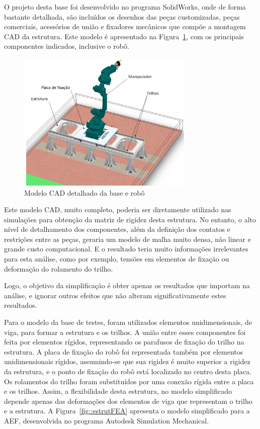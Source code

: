 O projeto desta base foi desenvolvido no programa SolidWorks, onde de forma
bastante detalhada, são incluídos os desenhos das peças customizadas, peças
comerciais, acessórios de união e fixadores mecânicos que compõe a montagem CAD
da estrutura. Este modelo é apresentado na Figura~\ref{fig::estrutCAD}, com os
principais componentes indicados, inclusive o robô.

\begin{figure}[h]
	\centering 
 	\includegraphics[width=0.75\textwidth]{figs/estrutCAD}
 	\caption{Modelo CAD detalhado da base e robô}
 	\label{fig::estrutCAD}
\end{figure}

Este modelo CAD, muito completo, poderia ser diretamente utilizado nas
simulações para obtenção da matriz de rigidez desta estrutura. No entanto, o
alto nível de detalhamento dos componentes, além da definição dos contatos e
restrições entre as peças, geraria um modelo de malha muito densa, não linear e
grande custo computacional. E o resultado teria muito informações irrelevantes
para esta análise, como por exemplo, tensões em elementos de fixação ou
deformação do rolamento do trilho.

Logo, o objetivo da simplificação é obter apenas os resultados que importam
na análise, e ignorar outros efeitos que não alteram significativamente
estes resultados. 

Para o modelo da base de testes, foram utilizados elementos unidimensionais, de
viga, para formar a estrutura e os trilhos. A união entre esses componentes foi
feita por elementos rígidos, representando os parafusos de fixação do trilho na
estrutura. A placa de fixação do robô foi representada também por elementos
unidimensionais rígidos, assumindo-se que sua rigidez é muito superior a rigidez
da estrutura, e o ponto de fixação do robô está localizado no centro desta
placa.
Os rolamentos do trilho foram substituídos por uma conexão rígida entre a placa
e os trilhos. Assim, a flexibilidade desta estrutura, no modelo simplificado
depende apenas das deformações dos elementos de viga que representam o trilho e
a estrutura. A Figura~\ref{fig::estrutFEA} apresenta o modelo simplificado para
a AEF, desenvolvida no programa Autodesk Simulation Mechanical.

